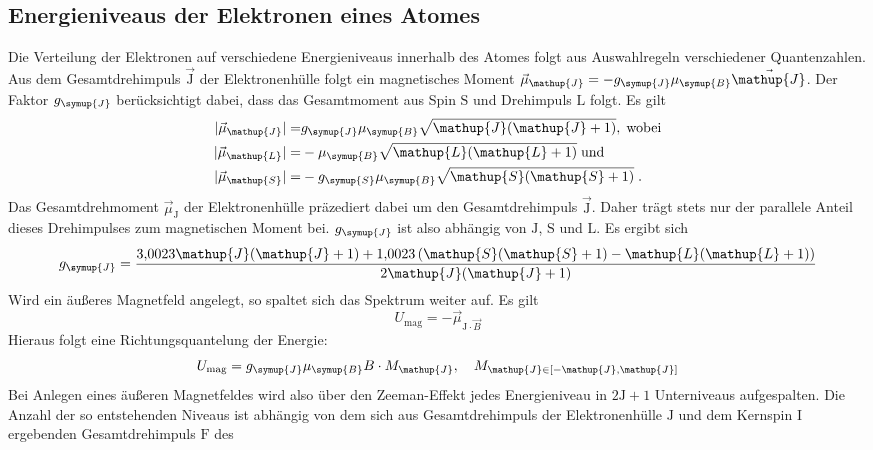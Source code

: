 \documentclass[
  bibliography=totoc,     %
  captions=tableheading,  %
  titlepage=firstiscover, %
]{scrartcl}
\begin{document}
\subsection{Energieniveaus der Elektronen eines Atomes}
%
Die Verteilung der Elektronen auf verschiedene Energieniveaus innerhalb des
Atomes folgt aus Auswahlregeln verschiedener Quantenzahlen. Aus dem
Gesamtdrehimpuls $\vec{\mathup{J}}$ der Elektronenhülle folgt ein magnetisches Moment
$\vec{\mu}_{\mathup{J}}=-g_{\symup{J}}\mu_{\symup{B}}\vec{\mathup{J}}$. Der Faktor $g_{\symup{J}}$
berücksichtigt dabei, dass das Gesamtmoment aus Spin $\mathup{S}$ und Drehimpuls $\mathup{L}$
folgt. Es gilt
%
\begin{align*}
  |\vec{\mu}_{\mathup{J}}|=&g_{\symup{J}}\mu_{\symup{B}}\sqrt{\mathup{J}(\mathup{J}+1)},\;\text{wobei} \\
  |\vec{\mu}_{\mathup{L}}|=&-\mu_{\symup{B}}\sqrt{\mathup{L}(\mathup{L}+1)}\;\text{und} \\
  |\vec{\mu}_{\mathup{S}}|=&-g_{\symup{S}}\mu_{\symup{B}}\sqrt{\mathup{S}(\mathup{S}+1)}\;.
\end{align*}
%
Das Gesamtdrehmoment $\vec{\mu}_{\mathup{J}}$ der Elektronenhülle präzediert dabei um den
Gesamtdrehimpuls $\vec{\mathup{J}}$. Daher trägt stets nur der parallele Anteil dieses
Drehimpulses zum magnetischen Moment bei. $g_{\symup{J}}$ ist also abhängig von
$\mathup{J}$, $\mathup{S}$ und $\mathup{L}$. Es ergibt sich
%
\begin{equation}
  g_{\symup{J}}=\frac{\num{3.0023}\mathup{J}(\mathup{J}+1)+\num{1.0023}\left(\mathup{S}(\mathup{S}+1)-\mathup{L}(\mathup{L}+1)\right)}{2\mathup{J}(\mathup{J}+1)}
  \label{eq:gj}
\end{equation}
%
Wird ein äußeres Magnetfeld angelegt, so spaltet sich das
Spektrum weiter auf. Es gilt
%
\begin{equation}
  U_{\text{mag}}=-\vec{\mu}_{\mathup{J}\cdot\vec{B}}
\end{equation}
%
Hieraus folgt eine Richtungsquantelung der Energie:
%
\begin{equation}
  U_{\text{mag}}=g_{\symup{J}}\mu_{\symup{B}}B\cdot M_{\mathup{J}},\quad M_{\mathup{J}\in[-\mathup{J},\mathup{J}]}
  \label{penis}
\end{equation}
%
Bei Anlegen eines äußeren Magnetfeldes wird also über den Zeeman-Effekt jedes
Energieniveau in $2\mathup{J}+1$ Unterniveaus aufgespalten. Die Anzahl der so
entstehenden Niveaus ist abhängig von dem sich aus Gesamtdrehimpuls der
Elektronenhülle $\mathup{J}$ und dem Kernspin $\mathup{I}$ ergebenden Gesamtdrehimpuls $\mathup{F}$ des
\end{document}
